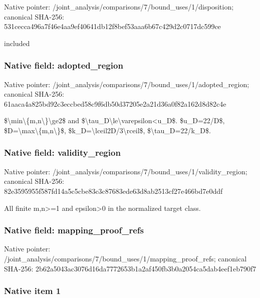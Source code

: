 \documentclass[10pt,a4paper]{article}
\begin{document}
Native pointer: /joint\_analysis/comparis\allowbreak{}ons/7/bound\_uses/1/dispo\allowbreak{}sition; canonical SHA-256: 531cecca496a7f46e4aa9ef4\allowbreak{}0641db12f8bef53aaa6b67c4\allowbreak{}29d2c0717dc599ce


included


\subsubsection{Native field: adopted\_region}


Native pointer: /joint\_analysis/comparis\allowbreak{}ons/7/bound\_uses/1/adopt\allowbreak{}ed\_region; canonical SHA-256: 61aaca4a825bd92c3eccbed5\allowbreak{}8c9f6db50d37205e2a21d36a\allowbreak{}0f82a162d8d82c4e


\$\textbackslash{}min\textbackslash{}\{m,n\textbackslash{}\}\textbackslash{}ge2\$ and \$\textbackslash{}tau\_D\textbackslash{}le\textbackslash{}varepsilon<u\_D\$. \$u\_D=22/D\$, \$D=\textbackslash{}max\textbackslash{}\{m,n\textbackslash{}\}\$, \$k\_D=\textbackslash{}lceil2D/3\textbackslash{}rceil\$, \$\textbackslash{}tau\_D=22/k\_D\$.


\subsubsection{Native field: validity\_region}


Native pointer: /joint\_analysis/comparis\allowbreak{}ons/7/bound\_uses/1/valid\allowbreak{}ity\_region; canonical SHA-256: 82e3595955f587fd14a5c5cb\allowbreak{}e83c3c87683ede63d8ab2513\allowbreak{}cf27e466bd7e0ddf


All finite m,n>=1 and epsilon>0 in the normalized target class.


\subsubsection{Native field: mapping\_proof\_refs}


Native pointer: /joint\_analysis/comparis\allowbreak{}ons/7/bound\_uses/1/mappi\allowbreak{}ng\_proof\_refs; canonical SHA-256: 2b62a5043ac3076d16da7772\allowbreak{}653b1a2af450fb3b0a2054ca\allowbreak{}5dab4eef1eb790f7



\subsubsection{Native item 1}
\end{document}
